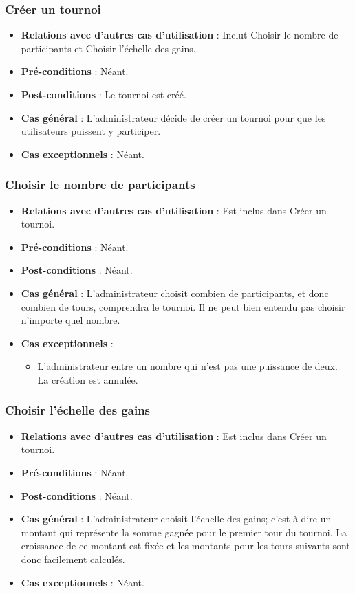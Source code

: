 \documentclass[a4paper,titlepage]{scrreprt}
\begin{document}
    \subsubsection{Créer un tournoi}
      \begin{itemize}
        \item \textbf{Relations avec d'autres cas d'utilisation}  : Inclut Choisir le nombre de participants et Choisir l'échelle des gains.
        \item \textbf{Pré-conditions} : Néant.
        \item \textbf{Post-conditions} : Le tournoi est créé.
        \item \textbf{Cas général} : L'administrateur décide de créer un tournoi pour que les utilisateurs puissent y participer.
        \item \textbf{Cas exceptionnels} : Néant.
      \end{itemize}

    \subsubsection{Choisir le nombre de participants}
      \begin{itemize}
        \item \textbf{Relations avec d'autres cas d'utilisation}  : Est inclus dans Créer un tournoi.
        \item \textbf{Pré-conditions} : Néant.
        \item \textbf{Post-conditions} : Néant.
        \item \textbf{Cas général} : L'administrateur choisit combien de participants, et donc combien de tours, comprendra le tournoi. Il ne peut bien entendu pas choisir n'importe quel nombre.
        \item \textbf{Cas exceptionnels} : 
          \begin{itemize}
            \item L'administrateur entre un nombre qui n'est pas une puissance de deux. La création est annulée.
          \end{itemize}
      \end{itemize}

    \subsubsection{Choisir l'échelle des gains}
      \begin{itemize}
        \item \textbf{Relations avec d'autres cas d'utilisation}  : Est inclus dans Créer un tournoi.
        \item \textbf{Pré-conditions} : Néant.
        \item \textbf{Post-conditions} : Néant.
        \item \textbf{Cas général} : L'administrateur choisit l'échelle des gains; c'est-à-dire un montant qui représente la somme gagnée pour le premier tour du tournoi. La croissance de ce montant est fixée et les montants pour les tours suivants sont donc facilement calculés.
        \item \textbf{Cas exceptionnels} : Néant.
      \end{itemize}
  
\end{document}
